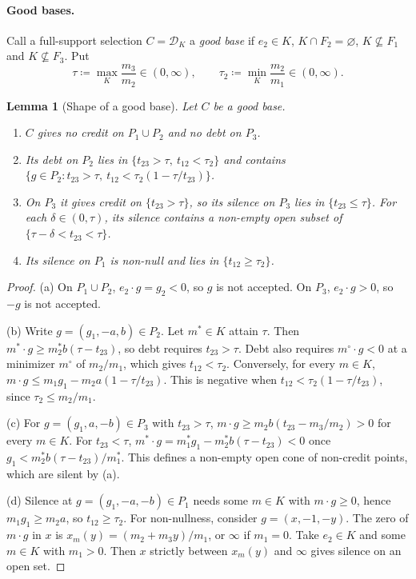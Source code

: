\documentclass[11pt]{article}
\newtheorem{lemma}[theorem]{Lemma}
\theoremstyle{definition}\newtheorem{definition}[theorem]{Definition}
\theoremstyle{remark}\newtheorem{remark}[theorem]{Remark}
\newcommand{\Dscr}{\mathcal D}
\begin{document}
\paragraph{Good bases.} Call a full-support selection $C=\Dscr_K$ a
\emph{good base} if $e_2\in K$, $K\cap F_2=\varnothing$, $K\not\subseteq F_1$
and $K\not\subseteq F_3$. Put
\[
 \tau\coloneqq\max_K\frac{m_3}{m_2}\in(0,\infty),\qquad
 \tau_2\coloneqq\min_K\frac{m_2}{m_1}\in(0,\infty).
\]

\begin{lemma}[Shape of a good base]\label{lem:shape}
Let $C$ be a good base.
\begin{enumerate}[label=(\alph*)]
\item $C$ gives no credit on $P_1\cup P_2$ and no debt on $P_3$.
\item Its debt on $P_2$ lies in $\{t_{23}>\tau,\ t_{12}<\tau_2\}$ and contains
$\{g\in P_2:t_{23}>\tau,\ t_{12}<\tau_2(1-\tau/t_{23})\}$.
\item On $P_3$ it gives credit on $\{t_{23}>\tau\}$, so its silence on $P_3$
lies in $\{t_{23}\le\tau\}$. For each $\delta\in(0,\tau)$, its silence
contains a non-empty open subset of $\{\tau-\delta<t_{23}<\tau\}$.
\item Its silence on $P_1$ is non-null and lies in $\{t_{12}\ge\tau_2\}$.
\end{enumerate}
\end{lemma}
\begin{proof}
(a) On $P_1\cup P_2$, $e_2\cdot g=g_2<0$, so $g$ is not accepted. On $P_3$,
$e_2\cdot g>0$, so $-g$ is not accepted.

(b) Write $g=(g_1,-a,b)\in P_2$. Let $m^*\in K$ attain $\tau$. Then
$m^*\cdot g\ge m^*_2b(\tau-t_{23})$, so debt requires $t_{23}>\tau$. Debt also
requires $m^\circ\cdot g<0$ at a minimizer $m^\circ$ of $m_2/m_1$, which gives
$t_{12}<\tau_2$. Conversely, for every $m\in K$,
$m\cdot g\le m_1g_1-m_2a(1-\tau/t_{23})$. This is negative when
$t_{12}<\tau_2(1-\tau/t_{23})$, since $\tau_2\le m_2/m_1$.

(c) For $g=(g_1,a,-b)\in P_3$ with $t_{23}>\tau$,
$m\cdot g\ge m_2b(t_{23}-m_3/m_2)>0$ for every $m\in K$. For
$t_{23}<\tau$, $m^*\cdot g=m^*_1g_1-m^*_2b(\tau-t_{23})<0$ once
$g_1<m^*_2b(\tau-t_{23})/m^*_1$. This defines a non-empty open cone of
non-credit points, which are silent by (a).

(d) Silence at $g=(g_1,-a,-b)\in P_1$ needs some $m\in K$ with
$m\cdot g\ge0$, hence $m_1g_1\ge m_2a$, so $t_{12}\ge\tau_2$. For
non-nullness, consider $g=(x,-1,-y)$. The zero of $m\cdot g$ in $x$ is
$x_m(y)=(m_2+m_3y)/m_1$, or $\infty$ if $m_1=0$. Take $e_2\in K$ and some
$m\in K$ with $m_1>0$. Then $x$ strictly between $x_m(y)$ and $\infty$ gives
silence on an open set.
\end{proof}
\end{document}
